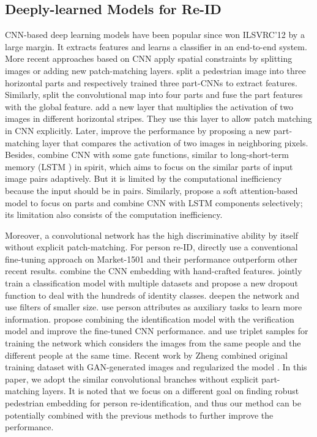 \subsection{Deeply-learned Models for Re-ID}
CNN-based deep learning models have been popular since \cite{krizhevsky2012imagenet} won ILSVRC'12 by a large margin. It extracts features and learns a classifier in an end-to-end system. More recent approaches based on CNN apply spatial constraints by splitting images or adding new patch-matching layers. \cite{yi2014deep} split a pedestrian image into three horizontal parts and respectively trained three part-CNNs to extract features. Similarly, \cite{cheng2016person} split the convolutional map into four parts and fuse the part features with the global feature. \cite{li2014deepreid} add a new layer that multiplies the activation of two images in different horizontal stripes. They use this layer to allow patch matching in CNN explicitly. Later, \cite{ahmed2015improved} improve the performance by proposing a new part-matching layer that compares the activation of two images in neighboring pixels. Besides, \cite{varior2016gated} combine CNN with some gate functions, similar to long-short-term memory (LSTM \cite{hochreiter1997long}) in spirit, which aims to focus on the similar parts of input image pairs adaptively. But it is limited by the computational inefficiency because the input should be in pairs. Similarly, \cite{liu2016end} propose a soft attention-based model to focus on parts and combine CNN with LSTM components selectively; its limitation also consists of the computation inefficiency. 

Moreover, a convolutional network has the high discriminative ability by itself without explicit patch-matching. For person re-ID, \cite{zheng2016person} directly use a conventional fine-tuning approach on Market-1501 \cite{zheng2015scalable} and their performance outperform other recent results. \cite{wu2016enhanced} combine the CNN embedding with hand-crafted features. \cite{xiao2016learning} jointly train a classification model with multiple datasets and propose a new dropout function to deal with the hundreds of identity classes. \cite{wu2016personnet} deepen the network and use filters of smaller size. \cite{lin2017improving} use person attributes as auxiliary tasks to learn more information. \cite{zheng2016discriminatively} propose combining the identification model with the verification model and improve the fine-tuned CNN performance. \cite{ding2015deep} and \cite{hermans2017defense} use triplet samples for training the network which considers the images from the same people and the different people at the same time. Recent work by Zheng \etal combined original training dataset with GAN-generated images and regularized the model \cite{zheng2017unlabeled}. In this paper, we adopt the similar convolutional branches without explicit part-matching layers. It is noted that we focus on a different goal on finding robust pedestrian embedding for person re-identification, and thus our method can be potentially combined with the previous methods to further improve the performance.


